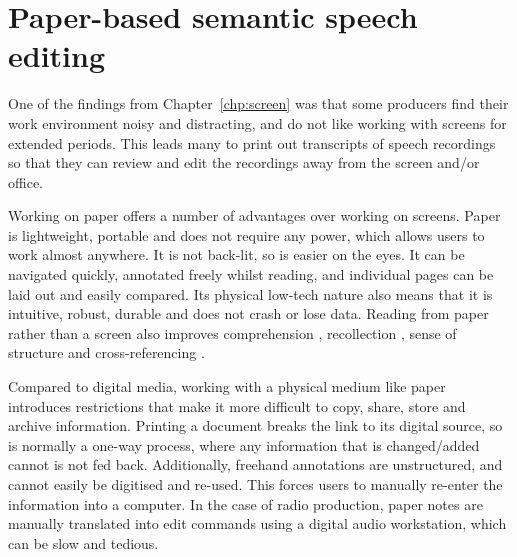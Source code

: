 \chapter{Paper-based semantic speech editing}\label{chp:paper}

One of the findings from Chapter~\ref{chp:screen} was that some producers find their work environment noisy and
distracting, and do not like working with screens for extended periods. This leads many to print out transcripts of
speech recordings so that they can review and edit the recordings away from the screen and/or office.

Working on paper offers a number of advantages over working on screens.  Paper is lightweight, portable and does not
require any power, which allows users to work almost anywhere.  It is not back-lit, so is easier on the eyes.  It can
be navigated quickly, annotated freely whilst reading, and individual pages can be laid out and easily compared.  Its
physical low-tech nature also means that it is intuitive, robust, durable and does not crash or lose data.  Reading
from paper rather than a screen also improves comprehension \citep{Mangen2013}, recollection \citep{Singer2017}, sense
of structure and cross-referencing \citep{OHara1997}.



Compared to digital media, working with a physical medium like paper introduces restrictions that make it more
difficult to copy, share, store and archive information. Printing a document breaks the link to its digital source, so
is normally a one-way process, where any information that is changed/added cannot is not fed back. Additionally,
freehand annotations are unstructured, and cannot easily be digitised and re-used. This forces users to manually
re-enter the information into a computer. In the case of radio production, paper notes are manually translated into
edit commands using a digital audio workstation, which can be slow and tedious.

